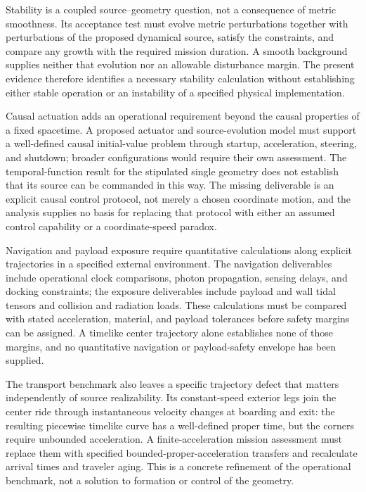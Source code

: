 \documentclass[11pt]{article}
\begin{document}
Stability is a coupled source–geometry question, not a consequence of metric smoothness. Its acceptance test must evolve metric perturbations together with perturbations of the proposed dynamical source, satisfy the constraints, and compare any growth with the required mission duration. A smooth background supplies neither that evolution nor an allowable disturbance margin. The present evidence therefore identifies a necessary stability calculation without establishing either stable operation or an instability of a specified physical implementation.

Causal actuation adds an operational requirement beyond the causal properties of a fixed spacetime. A proposed actuator and source-evolution model must support a well-defined causal initial-value problem through startup, acceleration, steering, and shutdown; broader configurations would require their own assessment. The temporal-function result for the stipulated single geometry does not establish that its source can be commanded in this way. The missing deliverable is an explicit causal control protocol, not merely a chosen coordinate motion, and the analysis supplies no basis for replacing that protocol with either an assumed control capability or a coordinate-speed paradox.

Navigation and payload exposure require quantitative calculations along explicit trajectories in a specified external environment. The navigation deliverables include operational clock comparisons, photon propagation, sensing delays, and docking constraints; the exposure deliverables include payload and wall tidal tensors and collision and radiation loads. These calculations must be compared with stated acceleration, material, and payload tolerances before safety margins can be assigned. A timelike center trajectory alone establishes none of those margins, and no quantitative navigation or payload-safety envelope has been supplied.

The transport benchmark also leaves a specific trajectory defect that matters independently of source realizability. Its constant-speed exterior legs join the center ride through instantaneous velocity changes at boarding and exit: the resulting piecewise timelike curve has a well-defined proper time, but the corners require unbounded acceleration. A finite-acceleration mission assessment must replace them with specified bounded-proper-acceleration transfers and recalculate arrival times and traveler aging. This is a concrete refinement of the operational benchmark, not a solution to formation or control of the geometry.
\end{document}
